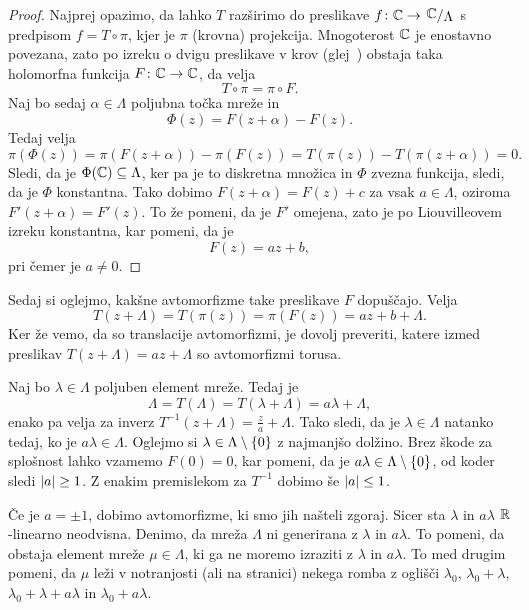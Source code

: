 \begin{proof}
Najprej opazimo, da lahko $T$ razširimo do preslikave
$f \colon \C \to \kvoc{\C}{\Lambda}$ s predpisom $f = T \circ \pi$,
kjer je $\pi$ (krovna) projekcija. Mnogoterost $\mathbb{C}$ je enostavno
povezana, zato po izreku o dvigu preslikave v krov
(glej~\cite[izrek~1.106]{Forstneric}) obstaja taka holomorfna
funkcija $F \colon \mathbb{C} \to \mathbb{C}$, da velja
\[
T \circ \pi = \pi \circ F.
\]
Naj bo sedaj $\alpha \in \Lambda$ poljubna točka mreže in
\[
\Phi(z) = F(z + \alpha) - F(z).
\]
Tedaj velja
\[
\pi(\Phi(z)) =
\pi(F(z + \alpha)) - \pi(F(z)) =
T(\pi(z)) - T(\pi(z + \alpha)) =
0.
\]
Sledi, da je $\Phi(\mathbb{C}) \subseteq \Lambda$, ker pa je to diskretna
množica in $\Phi$ zvezna funkcija, sledi, da je $\Phi$ konstantna.
Tako dobimo $F(z + \alpha) = F(z) + c$ za vsak $a \in \Lambda$,
oziroma $F'(z + \alpha) = F'(z)$. To že pomeni, da je $F'$ omejena,
zato je po Liouvilleovem izreku konstantna, kar pomeni, da je
\[
F(z) = az + b,
\]
pri čemer je $a \ne 0$.
\end{proof}

Sedaj si oglejmo, kakšne avtomorfizme take preslikave $F$
dopuščajo. Velja
\[
T(z + \Lambda) = T(\pi(z)) = \pi(F(z)) = az + b + \Lambda.
\]
Ker že vemo, da so translacije avtomorfizmi, je dovolj preveriti,
katere izmed preslikav $T(z + \Lambda) = az + \Lambda$ so
avtomorfizmi torusa.

Naj bo $\lambda \in \Lambda$ poljuben element mreže. Tedaj je
\[
\Lambda = T(\Lambda) = T(\lambda + \Lambda) = a\lambda + \Lambda,
\]
enako pa velja za inverz
$T^{-1}(z + \Lambda) = \frac{z}{a} + \Lambda$. Tako sledi, da je
$\lambda \in \Lambda$ natanko tedaj, ko je $a \lambda \in \Lambda$.
Oglejmo si $\lambda \in \Lambda \setminus \left\{0\right\}$ z najmanjšo
dolžino. Brez škode za splošnost lahko vzamemo $F(0) = 0$, kar
pomeni, da je $a \lambda \in \Lambda \setminus \left\{0\right\}$, od koder
sledi $\left\lvert a\right\rvert \geq 1$. Z enakim premislekom za $T^{-1}$ dobimo še
$\left\lvert a\right\rvert \leq 1$.

Če je $a = \pm 1$, dobimo avtomorfizme, ki smo jih našteli zgoraj.
Sicer sta $\lambda$ in $a \lambda$ $\mathbb{R}$-linearno neodvisna. Denimo,
da mreža $\Lambda$ ni generirana z $\lambda$ in $a \lambda$. To
pomeni, da obstaja element mreže $\mu \in \Lambda$, ki ga ne moremo
izraziti z $\lambda$ in $a \lambda$. To med drugim pomeni, da $\mu$
leži v notranjosti (ali na stranici) nekega romba z oglišči
$\lambda_0$, $\lambda_0 + \lambda$,
$\lambda_0 + \lambda + a \lambda$ in $\lambda_0 + a \lambda$.



